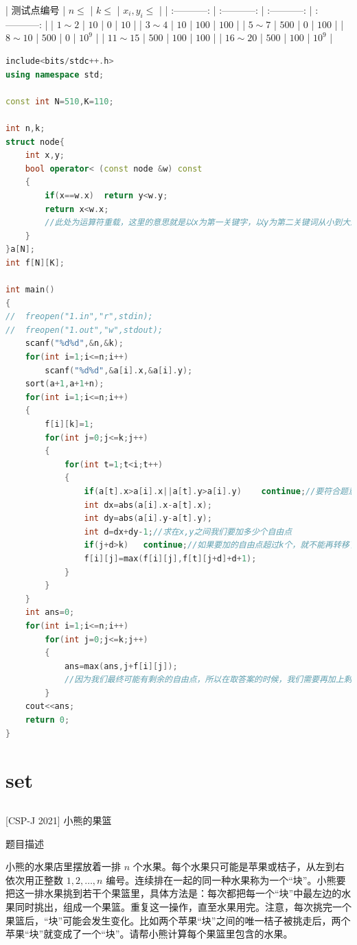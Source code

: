 \documentclass[12pt,twiside,a4paper]{ctexbook}
\numberwithin{chapter}{part}
\begin{document}
| 测试点编号 | $n \leq$ | $k \leq$ | $x_i,y_i \leq$ |
| :-----------: | :-----------: | :-----------: | :-----------: |
| $1 \sim 2$ | $10$ | $0$ | $10$ |
| $3 \sim 4$ | $10$ | $100$ | $100$ |
| $5 \sim 7$ | $500$ | $0$ | $100$ |
| $8 \sim 10$ | $500$ | $0$ | ${10}^9$ |
| $11 \sim 15$ | $500$ | $100$  | $100$ |
| $16 \sim 20$ | $500$ | $100$ | ${10}^9$ |
\begin{lstlisting}[language=c++,breaklines=true]
include<bits/stdc++.h>
using namespace std;

const int N=510,K=110;

int n,k;
struct node{
	int x,y;
	bool operator< (const node &w) const
	{
		if(x==w.x)	return y<w.y;
		return x<w.x;
		//此处为运算符重载，这里的意思就是以x为第一关键字，以y为第二关键词从小到大进行排序
	}
}a[N];
int f[N][K];

int main()
{
//	freopen("1.in","r",stdin);
//	freopen("1.out","w",stdout);
	scanf("%d%d",&n,&k);
	for(int i=1;i<=n;i++)
		scanf("%d%d",&a[i].x,&a[i].y);
	sort(a+1,a+1+n);
	for(int i=1;i<=n;i++)
	{
		f[i][k]=1;
		for(int j=0;j<=k;j++)
		{
			for(int t=1;t<i;t++)
			{
				if(a[t].x>a[i].x||a[t].y>a[i].y)	continue;//要符合题意的序列限制
				int dx=abs(a[i].x-a[t].x);
				int dy=abs(a[i].y-a[t].y);
				int d=dx+dy-1;//求在x,y之间我们要加多少个自由点
				if(j+d>k)	continue;//如果要加的自由点超过k个，就不能再转移了
				f[i][j]=max(f[i][j],f[t][j+d]+d+1);
			}
		}
	}
	int ans=0;
	for(int i=1;i<=n;i++)
		for(int j=0;j<=k;j++)
		{
			ans=max(ans,j+f[i][j]);
			//因为我们最终可能有剩余的自由点，所以在取答案的时候，我们需要再加上剩余的自由点数量
		}
	cout<<ans;
	return 0;
}
\end{lstlisting}

\chapter{set}
\section{}
 [CSP-J 2021] 小熊的果篮

 题目描述

小熊的水果店里摆放着一排 $n$ 个水果。每个水果只可能是苹果或桔子，从左到右依次用正整数 $1, 2, \ldots, n$ 编号。连续排在一起的同一种水果称为一个“块”。小熊要把这一排水果挑到若干个果篮里，具体方法是：每次都把每一个“块”中最左边的水果同时挑出，组成一个果篮。重复这一操作，直至水果用完。注意，每次挑完一个果篮后，“块”可能会发生变化。比如两个苹果“块”之间的唯一桔子被挑走后，两个苹果“块”就变成了一个“块”。请帮小熊计算每个果篮里包含的水果。
\end{document}
